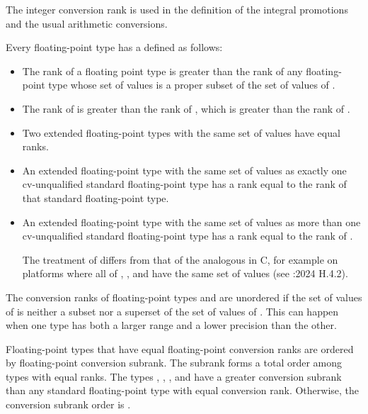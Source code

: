 \begin{note}
The integer conversion rank is used in the definition of the integral
promotions and the usual arithmetic
conversions.
\end{note}

\pnum
Every floating-point type has a 
defined as follows:
\begin{itemize}
\item
The rank of a floating point type  is greater than
the rank of any floating-point type
whose set of values is a proper subset of the set of values of .
\item
The rank of  is greater than
the rank of ,
which is greater than the rank of .
\item
Two extended floating-point types with the same set of values have equal ranks.
\item
An extended floating-point type with the same set of values as
exactly one cv-unqualified standard floating-point type
has a rank equal to the rank of that standard floating-point type.
\item
An extended floating-point type with the same set of values as
more than one cv-unqualified standard floating-point type
has a rank equal to the rank of .
\begin{tailnote}
The treatment of  differs from
that of the analogous  in C,
for example on platforms where all of
,
, and
have the same set of values (see \IsoCUndated{}:2024 H.4.2).
\end{tailnote}
\end{itemize}
\begin{note}
The conversion ranks of floating-point types  and 
are unordered if the set of values of  is
neither a subset nor a superset of the set of values of .
This can happen when one type has both a larger range and a lower precision
than the other.
\end{note}

\pnum
Floating-point types that have equal floating-point conversion ranks
are ordered by floating-point conversion subrank.
The subrank forms a total order among types with equal ranks.
The types
,
,
, and
have a greater conversion subrank than any standard floating-point type
with equal conversion rank.
Otherwise, the conversion subrank order is
.

